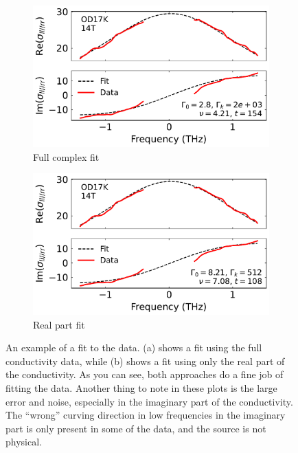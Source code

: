 \begin{figure}
    \centering
    \begin{subfigure}{0.48\textwidth}
        \centering
        \includegraphics[width=\textwidth]{figures/fit_example_complex}
        \caption{Full complex fit}
    \end{subfigure}
    \begin{subfigure}{0.48\textwidth}
        \centering
        \includegraphics[width=\textwidth]{figures/fit_example_real}
        \caption{Real part fit}
    \end{subfigure}
    \caption{An example of a fit to the data. (a) shows a fit using the full conductivity data,
        while (b) shows a fit using only the real part of the conductivity. As you can see, both
        approaches do a fine job of fitting the data. Another thing to note in these plots is the
        large error and noise, especially in the imaginary part of the conductivity. The ``wrong''
        curving direction in low frequencies in the imaginary part is only present in some of the
        data, and the source is not physical.}
    \label{fig:fitting_example}
\end{figure}

